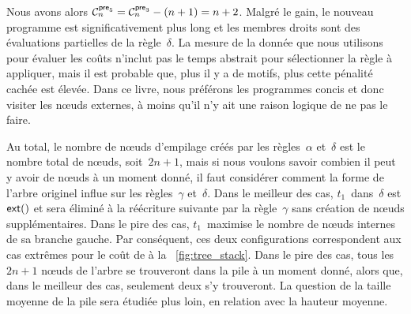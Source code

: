 Nous avons alors \(\C{\fun{pre}_5}{n} = \C{\fun{pre}_3}{n} - (n+1) = n
+
2\).
Malgré le gain, le nouveau programme est significativement plus long
et les membres droits sont des évaluations partielles de la règle~\(\delta\). La
mesure de la donnée que nous utilisons pour évaluer les coûts n'inclut
pas le temps abstrait pour sélectionner la règle à appliquer, mais il
est probable que, plus il y a de motifs, plus cette pénalité cachée
est élevée. Dans ce livre, nous préférons les programmes concis et
donc visiter les nœuds externes, à moins qu'il n'y ait une raison
logique de ne pas le faire.

Au total, le nombre de nœuds d'empilage
créés par les règles~\(\alpha\) et~\(\delta\) est le nombre total de
nœuds, soit~\(2n+1\), mais si nous voulons savoir combien il peut
y avoir de nœuds à un moment donné, il faut considérer comment la
forme de l'arbre originel influe sur les règles~\(\gamma\)
et~\(\delta\). Dans le meilleur des cas, \(t_1\)~dans~\(\delta\) est
\(\fun{ext}()\) et sera éliminé à la réécriture suivante par la
règle~\(\gamma\) sans création de nœuds supplémentaires. Dans le
pire des cas, \(t_1\)~maximise le nombre de nœuds internes de sa
branche gauche. Par conséquent, ces deux configurations correspondent
aux cas extrêmes pour le coût de
 à la
\fig~\vref{fig:tree_stack}. Dans le pire des cas, tous les \(2n+1\)
nœuds de l'arbre se trouveront dans la pile à un moment donné,
alors que, dans le meilleur des cas, seulement deux s'y trouveront. La
question de la taille moyenne de la pile sera étudiée plus loin, en
relation avec la hauteur moyenne.


